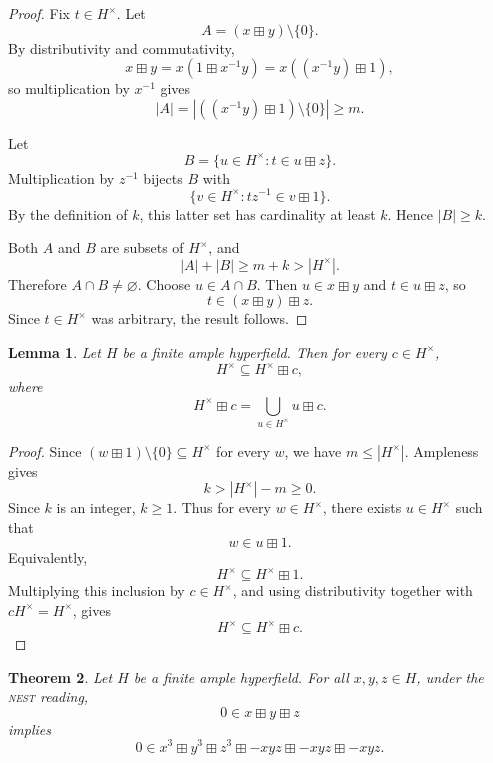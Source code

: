 \documentclass[12pt]{article}
\newtheorem{theorem}{Theorem}[section]
\newtheorem{lemma}[theorem]{Lemma}
\theoremstyle{definition}
\theoremstyle{remark}
\numberwithin{equation}{section}
\begin{document}
\begin{proof}
Fix \(t\in H^\times\). Let
\[
A=(x\boxplus y)\setminus\{0\}.
\]
By distributivity and commutativity,
\[
x\boxplus y=x(1\boxplus x^{-1}y)=x((x^{-1}y)\boxplus1),
\]
so multiplication by \(x^{-1}\) gives
\[
|A|=|((x^{-1}y)\boxplus1)\setminus\{0\}|\ge m.
\]

Let
\[
B=\{u\in H^\times:t\in u\boxplus z\}.
\]
Multiplication by \(z^{-1}\) bijects \(B\) with
\[
\{v\in H^\times:tz^{-1}\in v\boxplus1\}.
\]
By the definition of \(k\), this latter set has cardinality at least \(k\). Hence \(|B|\ge k\).

Both \(A\) and \(B\) are subsets of \(H^\times\), and
\[
|A|+|B|\ge m+k>|H^\times|.
\]
Therefore \(A\cap B\neq\varnothing\). Choose \(u\in A\cap B\). Then \(u\in x\boxplus y\) and \(t\in u\boxplus z\), so
\[
t\in (x\boxplus y)\boxplus z.
\]
Since \(t\in H^\times\) was arbitrary, the result follows.
\end{proof}

\begin{lemma}\label{lem:propagation}
Let \(H\) be a finite ample hyperfield. Then for every \(c\in H^\times\),
\[
H^\times\subseteq H^\times\boxplus c,
\]
where
\[
H^\times\boxplus c=\bigcup_{u\in H^\times}u\boxplus c.
\]
\end{lemma}

\begin{proof}
Since \((w\boxplus1)\setminus\{0\}\subseteq H^\times\) for every \(w\), we have \(m\le |H^\times|\). Ampleness gives
\[
k>|H^\times|-m\ge0.
\]
Since \(k\) is an integer, \(k\ge1\). Thus for every \(w\in H^\times\), there exists \(u\in H^\times\) such that
\[
w\in u\boxplus1.
\]
Equivalently,
\[
H^\times\subseteq H^\times\boxplus1.
\]
Multiplying this inclusion by \(c\in H^\times\), and using distributivity together with \(cH^\times=H^\times\), gives
\[
H^\times\subseteq H^\times\boxplus c.
\]
\end{proof}

\begin{theorem}\label{thm:ample}
Let \(H\) be a finite ample hyperfield. For all \(x,y,z\in H\), under the \textsc{nest} reading,
\[
0\in x\boxplus y\boxplus z
\]
implies
\[
0\in x^3\boxplus y^3\boxplus z^3\boxplus -xyz\boxplus -xyz\boxplus -xyz.
\]
\end{theorem}
\end{document}
